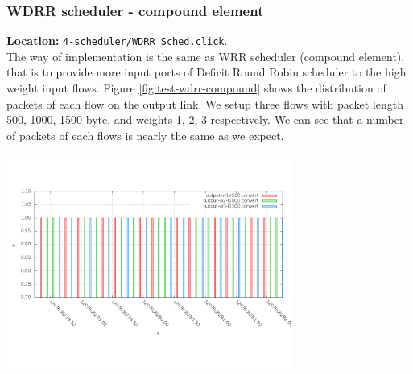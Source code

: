 \documentclass[a4paper]{article}
\begin{document}
  \subsubsection{WDRR scheduler - compound element}
  \textbf{Location:} \texttt{4-scheduler/WDRR\_Sched.click}.\\
  The way of implementation is the same as WRR scheduler (compound element), that is to provide more input ports of Deficit Round Robin scheduler to the high weight input flows. Figure \ref{fig:test-wdrr-compound} shows the distribution of packets of each flow on the output link. We setup three flows with packet length 500, 1000, 1500 byte, and weights 1, 2, 3 respectively. We can see that a number of packets of each flows is nearly the same as we expect.
  \begin{center}
	\includegraphics[width=0.70\textwidth]{wdrr-dense-compound.png}
	\label{fig:test-wdrr-compound}
  \end{center}
\end{document}
